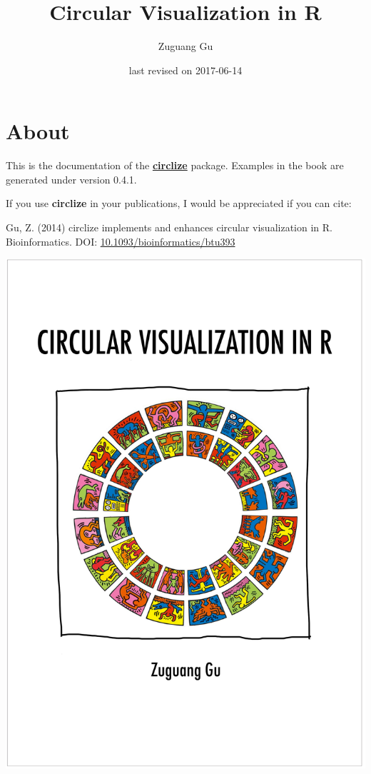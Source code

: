 \documentclass[]{book}
\title{Circular Visualization in R}
\author{Zuguang Gu}
\date{last revised on 2017-06-14}
\theoremstyle{definition}
\theoremstyle{definition}
\theoremstyle{remark}
\begin{document}
\maketitle

{
\setcounter{tocdepth}{1}
\tableofcontents
}
\chapter*{About}\label{about}

This is the documentation of the
\href{https://cran.r-project.org/package=circlize}{\textbf{circlize}}
package. Examples in the book are generated under version 0.4.1.

If you use \textbf{circlize} in your publications, I would be
appreciated if you can cite:

Gu, Z. (2014) circlize implements and enhances circular visualization in
R. Bioinformatics. DOI:
\href{https://doi.org/10.1093/bioinformatics/btu393}{10.1093/bioinformatics/btu393}

\begin{center}\includegraphics[width=34.44in]{images/circlize_cover} \end{center}
\end{document}
